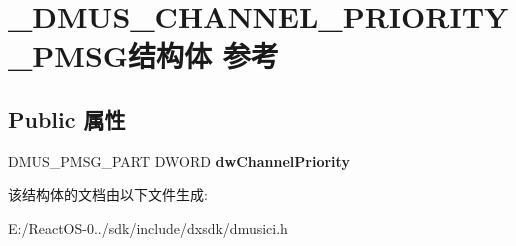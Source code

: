 \hypertarget{struct___d_m_u_s___c_h_a_n_n_e_l___p_r_i_o_r_i_t_y___p_m_s_g}{}\section{\+\_\+\+D\+M\+U\+S\+\_\+\+C\+H\+A\+N\+N\+E\+L\+\_\+\+P\+R\+I\+O\+R\+I\+T\+Y\+\_\+\+P\+M\+S\+G结构体 参考}
\label{struct___d_m_u_s___c_h_a_n_n_e_l___p_r_i_o_r_i_t_y___p_m_s_g}
\subsection*{Public 属性}
\begin{DoxyCompactItemize}
\item 
\mbox{\label{struct___d_m_u_s___c_h_a_n_n_e_l___p_r_i_o_r_i_t_y___p_m_s_g_a8085d2495e33e1c829be6fd940d734c3}} 
D\+M\+U\+S\+\_\+\+P\+M\+S\+G\+\_\+\+P\+A\+RT D\+W\+O\+RD {\bfseries dw\+Channel\+Priority}
\end{DoxyCompactItemize}


该结构体的文档由以下文件生成\+:\begin{DoxyCompactItemize}
\item 
E\+:/\+React\+O\+S-\/0../sdk/include/dxsdk/dmusici.\+h\end{DoxyCompactItemize}
